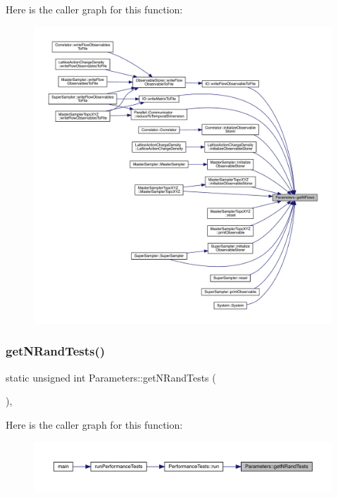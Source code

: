Here is the caller graph for this function\+:
\nopagebreak
\begin{figure}[H]
\begin{center}
\leavevmode
\includegraphics[width=350pt]{class_parameters_aae314edb18d426571ab7b6df60da70aa_icgraph}
\end{center}
\end{figure}
\mbox{\label{class_parameters_a492a81a7a0951b1165f500f8c0768fe1}} 
\subsubsection{\texorpdfstring{getNRandTests()}{getNRandTests()}}
{\footnotesize\ttfamily static unsigned int Parameters\+::get\+N\+Rand\+Tests (\begin{DoxyParamCaption}{ }\end{DoxyParamCaption})\hspace{0.3cm}{\ttfamily [inline]}, {\ttfamily [static]}}

Here is the caller graph for this function\+:
\nopagebreak
\begin{figure}[H]
\begin{center}
\leavevmode
\includegraphics[width=350pt]{class_parameters_a492a81a7a0951b1165f500f8c0768fe1_icgraph}
\end{center}
\end{figure}
\mbox{\label{class_parameters_a52b90e94a378ec9fe8c504cf546e98fa}} 
